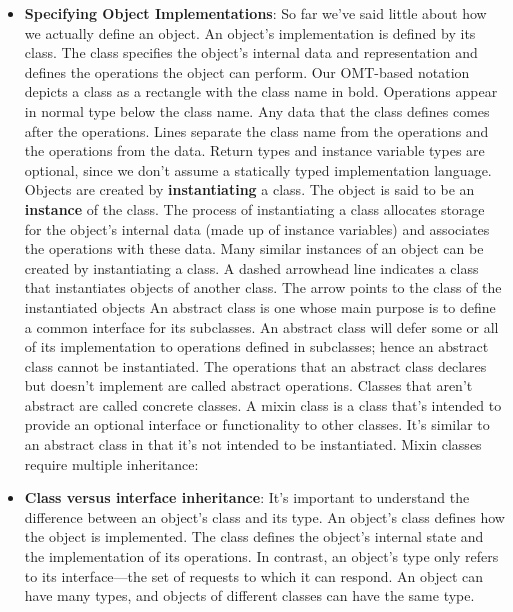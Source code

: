 \documentclass{report}
\begin{document}
\begin{itemize}
        \item \textbf{Specifying Object Implementations}: So far we've said little about how we actually define an object. An object's implementation is defined by its class. The class specifies the object's internal data and representation and defines the operations the object can perform. 
            \bigbreak \noindent 
            Our OMT-based notation depicts a class as a rectangle with the class name in bold. Operations appear in normal type below the class name. Any data that the class defines comes after the operations. Lines separate the class name from the operations and the operations from the data. 
            \bigbreak \noindent 
            \bigbreak \noindent 
            Return types and instance variable types are optional, since we don't assume a statically typed implementation language. 
            \bigbreak \noindent 
            Objects are created by \textbf{instantiating} a class. The object is said to be an \textbf{instance} of the class. The process of instantiating a class allocates storage for the object's internal data (made up of instance variables) and associates the operations with these data. Many similar instances of an object can be created by instantiating a class. 
            \bigbreak \noindent 
            A dashed arrowhead line indicates a class that instantiates objects of another class. The arrow points to the class of the instantiated objects
            \bigbreak \noindent 
            \bigbreak \noindent 
            An abstract class is one whose main purpose is to define a common interface for its subclasses. An abstract class will defer some or all of its implementation to operations defined in subclasses; hence an abstract class cannot be instantiated. 
            \bigbreak \noindent 
            The operations that an abstract class declares but doesn't implement are called abstract operations. Classes that aren't abstract are called concrete classes.
            \bigbreak \noindent 
            A mixin class is a class that's intended to provide an optional interface or functionality to other classes. It's similar to an abstract class in that it's not intended to be instantiated. Mixin classes require multiple inheritance:
            \bigbreak \noindent 
        \item \textbf{Class versus interface inheritance}: It's important to understand the difference between an object's class and its type. An object's class defines how the object is implemented. The class defines the object's internal state and the implementation of its operations. In contrast, an object's type only refers to its interface—the set of requests to which it can respond. An object can have many types, and objects of different classes can have the same type. 

\end{itemize}
\end{document}
